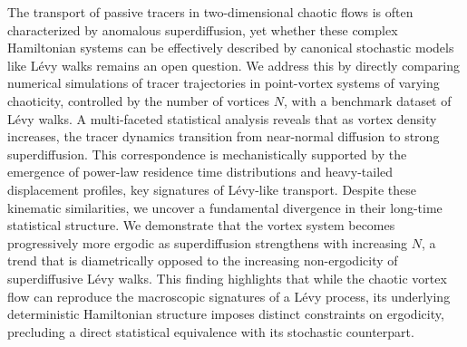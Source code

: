 \documentclass[]{article}
\begin{document}
The transport of passive tracers in two-dimensional chaotic flows is often characterized by anomalous superdiffusion, yet whether these complex Hamiltonian systems can be effectively described by canonical stochastic models like Lévy walks remains an open question. We address this by directly comparing numerical simulations of tracer trajectories in point-vortex systems of varying chaoticity, controlled by the number of vortices $N$, with a benchmark dataset of Lévy walks. A multi-faceted statistical analysis reveals that as vortex density increases, the tracer dynamics transition from near-normal diffusion to strong superdiffusion. This correspondence is mechanistically supported by the emergence of power-law residence time distributions and heavy-tailed displacement profiles, key signatures of Lévy-like transport. Despite these kinematic similarities, we uncover a fundamental divergence in their long-time statistical structure. We demonstrate that the vortex system becomes progressively more ergodic as superdiffusion strengthens with increasing $N$, a trend that is diametrically opposed to the increasing non-ergodicity of superdiffusive Lévy walks. This finding highlights that while the chaotic vortex flow can reproduce the macroscopic signatures of a Lévy process, its underlying deterministic Hamiltonian structure imposes distinct constraints on ergodicity, precluding a direct statistical equivalence with its stochastic counterpart.
\end{document}
